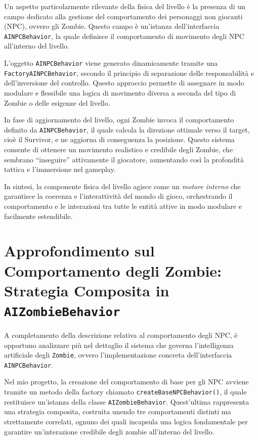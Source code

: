 \documentclass[a4paper,12pt]{report}
\begin{document}
\bigskip

Un aspetto particolarmente rilevante della fisica del livello è la presenza di un campo dedicato alla gestione del comportamento dei personaggi non giocanti (NPC), ovvero gli Zombie. Questo campo è un'istanza dell'interfaccia \texttt{AINPCBehavior}, la quale definisce il comportamento di movimento degli NPC all'interno del livello.

L’oggetto \texttt{AINPCBehavior} viene generato dinamicamente tramite una \texttt{FactoryAINPCBehavior}, secondo il principio di separazione delle responsabilità e dell’inversione del controllo. Questo approccio permette di assegnare in modo modulare e flessibile una logica di movimento diversa a seconda del tipo di Zombie o delle esigenze del livello.

In fase di aggiornamento del livello, ogni Zombie invoca il comportamento definito da \texttt{AINPCBehavior}, il quale calcola la direzione ottimale verso il target, cioè il Survivor, e ne aggiorna di conseguenza la posizione. Questo sistema consente di ottenere un movimento realistico e credibile degli Zombie, che sembrano “inseguire” attivamente il giocatore, aumentando così la profondità tattica e l’immersione nel gameplay.

\bigskip
In sintesi, la componente fisica del livello agisce come un \textit{motore interno} che garantisce la coerenza e l’interattività del mondo di gioco, orchestrando il comportamento e le interazioni tra tutte le entità attive in modo modulare e facilmente estendibile.
\section{Approfondimento sul Comportamento degli Zombie: Strategia Composita in \texttt{AIZombieBehavior}}

A completamento della descrizione relativa al comportamento degli NPC, è opportuno analizzare più nel dettaglio il sistema che governa l'intelligenza artificiale degli \texttt{Zombie}, ovvero l'implementazione concreta dell’interfaccia \texttt{AINPCBehavior}.

Nel mio progetto, la creazione del comportamento di base per gli NPC avviene tramite un metodo della factory chiamato \texttt{createBaseNPCBehavior()}, il quale restituisce un’istanza della classe \texttt{AIZombieBehavior}. Quest’ultima rappresenta una strategia composita, costruita unendo tre comportamenti distinti ma strettamente correlati, ognuno dei quali incapsula una logica fondamentale per garantire un'interazione credibile degli zombie all’interno del livello.
\end{document}
